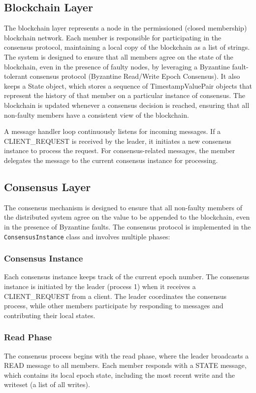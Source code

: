 \documentclass[runningheads]{llncs}
\begin{document}
\subsection{Blockchain Layer}
The blockchain layer represents a node in the permissioned (closed membership) blockchain network. Each member is responsible for participating in the consensus protocol, maintaining a local copy of the blockchain as a list of strings. The system is designed to ensure that all members agree on the state of the blockchain, even in the presence of faulty nodes, by leveraging a Byzantine fault-tolerant consensus protocol (Byzantine Read/Write Epoch Consensus). It also keeps a State object, which stores a sequence of TimestampValuePair objects that represent the history of that member on a particular instance of consensus. The blockchain is updated whenever a consensus decision is reached, ensuring that all non-faulty members have a consistent view of the blockchain.

A message handler loop continuously listens for incoming messages. If a CLIENT\_REQUEST is received by the leader, it initiates a new consensus instance to process the request. For consensus-related messages, the member delegates the message to the current consensus instance for processing.

\subsection{Consensus Layer}
The consensus mechanism is designed to ensure that all non-faulty members of the distributed system agree on the value to be appended to the blockchain, even in the presence of Byzantine faults. The consensus protocol is implemented in the \texttt{ConsensusInstance} class and involves multiple phases:

\subsubsection{Consensus Instance}
Each consensus instance keeps track of the current epoch number. The consensus instance is initiated by the leader (process 1) when it receives a CLIENT\_REQUEST from a client. The leader coordinates the consensus process, while other members participate by responding to messages and contributing their local states.

\subsubsection{Read Phase}
The consensus process begins with the read phase, where the leader broadcasts a READ message to all members. Each member responds with a STATE message, which contains its local epoch state, including the most recent write and the writeset (a list of all writes).
\end{document}
